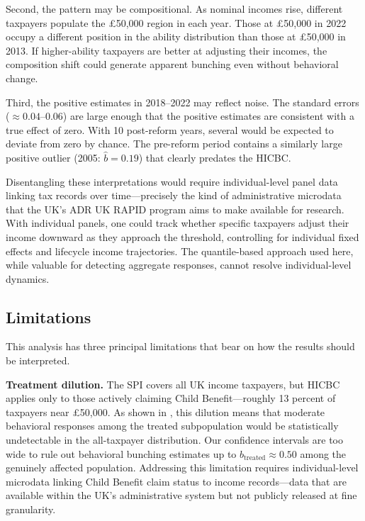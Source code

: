 \documentclass[12pt]{article}
\newcommand{\bhat}{\hat{b}}
\begin{document}
Second, the pattern may be compositional. As nominal incomes rise, different taxpayers populate the \pounds50,000 region in each year. Those at \pounds50,000 in 2022 occupy a different position in the ability distribution than those at \pounds50,000 in 2013. If higher-ability taxpayers are better at adjusting their incomes, the composition shift could generate apparent bunching even without behavioral change.

Third, the positive estimates in 2018--2022 may reflect noise. The standard errors ($\approx 0.04$--$0.06$) are large enough that the positive estimates are consistent with a true effect of zero. With 10 post-reform years, several would be expected to deviate from zero by chance. The pre-reform period contains a similarly large positive outlier (2005: $\bhat = 0.19$) that clearly predates the HICBC.

Disentangling these interpretations would require individual-level panel data linking tax records over time---precisely the kind of administrative microdata that the UK's ADR UK RAPID program aims to make available for research. With individual panels, one could track whether specific taxpayers adjust their income downward as they approach the threshold, controlling for individual fixed effects and lifecycle income trajectories. The quantile-based approach used here, while valuable for detecting aggregate responses, cannot resolve individual-level dynamics.

\subsection{Limitations}
\label{sec:limitations}

This analysis has three principal limitations that bear on how the results should be interpreted.

\textbf{Treatment dilution.} The SPI covers all UK income taxpayers, but HICBC applies only to those actively claiming Child Benefit---roughly 13 percent of taxpayers near \pounds50,000. As shown in , this dilution means that moderate behavioral responses among the treated subpopulation would be statistically undetectable in the all-taxpayer distribution. Our confidence intervals are too wide to rule out behavioral bunching estimates up to $b_{\text{treated}} \approx 0.50$ among the genuinely affected population. Addressing this limitation requires individual-level microdata linking Child Benefit claim status to income records---data that are available within the UK's administrative system but not publicly released at fine granularity.
\end{document}
